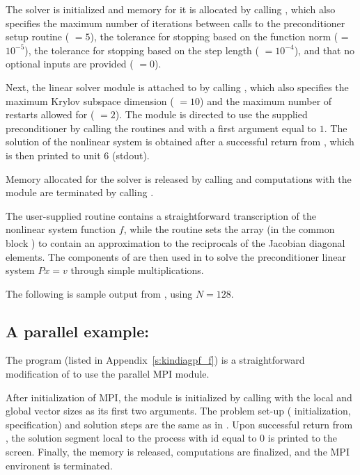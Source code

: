 The {\kinsol} solver is initialized and memory for it is allocated by
calling , which also specifies the maximum number of 
iterations between calls to the preconditioner setup routine ( $=5$),
the tolerance for stopping based on the function norm ( = $10^{-5}$),
the tolerance for stopping based on the step length ( $=10^{-4}$),
and that no optional inputs are provided ( $=0$).

Next, the {\kinspgmr} linear solver module is attached to {\kinsol} by calling , 
which also specifies the maximum Krylov subspace dimension ( $=10$) and the
maximum number of restarts allowed for {\spgmr} ( $=2$).
The {\kinspgmr} module is directed to use the supplied preconditioner by 
calling the routines  and  with
a first argument equal to $1$. The solution of the nonlinear system is obtained after
a successful return from , which is then printed to unit 6 (stdout).

Memory allocated for the {\kinsol} solver is released by calling  and
computations with the {\nvecs} module are terminated by calling .

The user-supplied routine  contains a straightforward transcription
of the nonlinear system function $f$, while the routine  sets the
array  (in the common block ) to contain an approximation to 
the reciprocals of the Jacobian diagonal elements. The components of  are
then used in  to solve the preconditioner linear system $Px=v$
through simple multiplications.

The following is sample output from , using $N = 128$.



\subsection{A parallel example: }\label{ss:kindiagpf}

The program  (listed in Appendix~\ref{s:kindiagpf_f}) is a
straightforward modification of  to use the parallel MPI
{\nvecp} module.

After initialization of MPI, the {\nvecp} module is initialized by calling
 with the local and global vector sizes as its first two
arguments.
The problem set-up ({\kinsol} initialization, {\kinspgmr} specification) and
solution steps are the same as in . 
Upon successful return from , the solution segment local to 
the process with id equal to $0$ is printed to the screen.
Finally, the {\kinsol} memory is released, {\nvecp} computations are 
finalized, and the MPI environent is terminated. 

